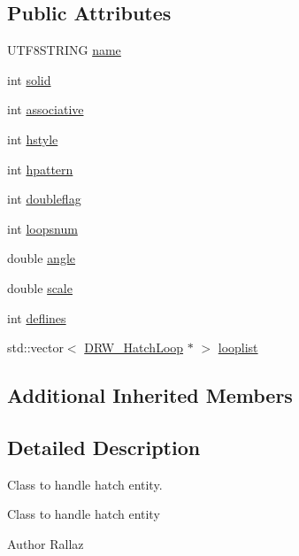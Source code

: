 \subsection*{Public Attributes}
\begin{DoxyCompactItemize}
\item 
U\-T\-F8\-S\-T\-R\-I\-N\-G \hyperlink{classDRW__Hatch_a3e864b79a0757b7ab2a8c32a21165150}{name}
\item 
int \hyperlink{classDRW__Hatch_a4eec0fc3cd839a3892e875bcc9789d48}{solid}
\item 
int \hyperlink{classDRW__Hatch_af152cba96e8bd0471aafd2764defe458}{associative}
\item 
int \hyperlink{classDRW__Hatch_a7b8950911e5fb319f0d63b7ee2251f87}{hstyle}
\item 
int \hyperlink{classDRW__Hatch_abb23290d594b69e7b9c18ece2de7ec8e}{hpattern}
\item 
int \hyperlink{classDRW__Hatch_a06da8a64445bd9e5c159dab4243c992a}{doubleflag}
\item 
int \hyperlink{classDRW__Hatch_a52ba4f38bba83fe735cb14447e256260}{loopsnum}
\item 
double \hyperlink{classDRW__Hatch_aee22d8d574a33e852ad82c345899b886}{angle}
\item 
double \hyperlink{classDRW__Hatch_a0ee3311f6d41385488af2cafd55cd7ef}{scale}
\item 
int \hyperlink{classDRW__Hatch_a15bd241e3c34d82c35db31470fe25741}{deflines}
\item 
std\-::vector$<$ \hyperlink{classDRW__HatchLoop}{D\-R\-W\-\_\-\-Hatch\-Loop} $\ast$ $>$ \hyperlink{classDRW__Hatch_a258a13a2da31ae31fd22e2da3757da5c}{looplist}
\end{DoxyCompactItemize}
\subsection*{Additional Inherited Members}


\subsection{Detailed Description}
Class to handle hatch entity. 

Class to handle hatch entity \begin{DoxyAuthor}{Author}
Rallaz 
\end{DoxyAuthor}


